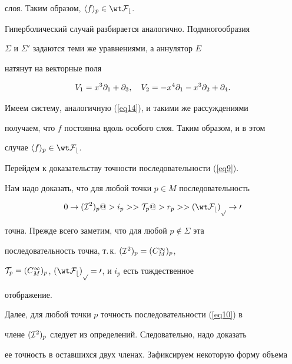 \begin{pf}
слоя. Таким образом, $\germ{f}{p} \in \wt\cF_b$.





Гиперболический случай разбирается аналогично. Подмногообразия


$\Sigma$ и $\Sigma'$ задаются теми же уравнениями, а аннулятор $E$


натянут на векторные поля


\begin{equation}


\label{eq13}


V_1 = x^3\pd_1 + \pd_3, \quad V_2 = - x^4\pd_1 - x^3\pd_2 + \pd_4.


\end{equation}


Имеем систему, аналогичную (\ref{eq14}), и такими же рассуждениями


получаем, что $f$ постоянна вдоль особого слоя. Таким образом, и в этом


случае $\germ{f}{p} \in \wt\cF_b$.








Перейдем к доказательству точности последовательности (\ref{eq9}).


Нам надо доказать, что для любой точки $p \in M$ последовательность


\begin{equation} \label{eq10}


0 \to (\cI^2)_p @>{i_p}>> \cT_p @>{r_p}>> (\wt\cF_b)_p \to


0


\end{equation}


точна. Прежде всего заметим, что для любой $p \not\in \Sigma$ эта


последовательность точна, т.\,к. $({\cal I}^2)_p = (C^\infty_M)_p$,


${\cal T}_p = (C^\infty_M)_p$, $(\wt\cF_b)_p=0$, и $i_p$ есть тождественное


отображение.





Далее, для любой точки $p$ точность последовательности (\ref{eq10}) в


члене $({\cal I}^2)_p$ следует из определений. Следовательно, надо доказать


ее точность в оставшихся двух членах. Зафиксируем некоторую форму объема



\end{pf}
